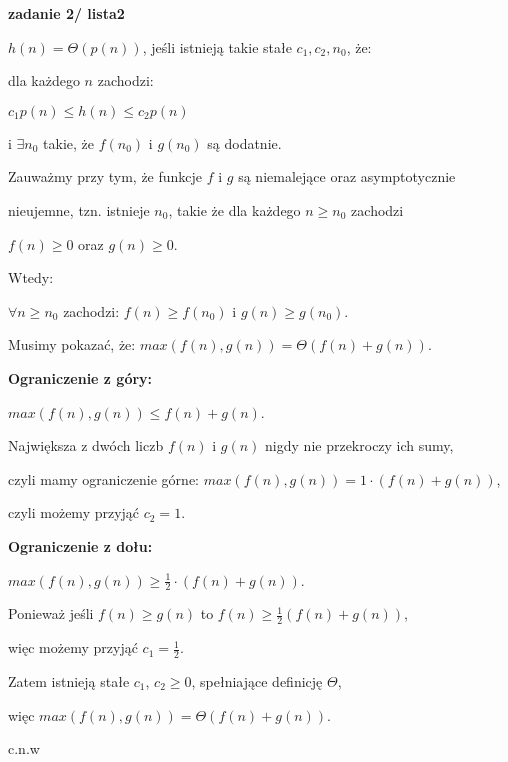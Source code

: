 \documentclass{article}
\begin{document}
    \vspace{1\baselineskip}
    \textbf{zadanie 2/ lista2} \par
    $h(n) = \Theta(p(n))$, jeśli istnieją takie stałe $c_1, c_2, n_0 $, że: \par
    dla każdego $n$ zachodzi: \par
    $c_1p(n) \leq h(n) \leq c_2p(n)$ \par
    i $\exists n_0$ takie, że $f(n_0)$ i $g(n_0)$ są dodatnie. \par
    \par
    Zauważmy przy tym, że funkcje $f$ i $g$ są niemalejące oraz asymptotycznie \par nieujemne, tzn. istnieje $n_0$, takie że dla każdego $n \geq n_0$ zachodzi \par $f(n) \geq 0$ oraz $g(n) \geq 0$. \par
    \par
    \vspace{1\baselineskip}
    Wtedy: \par
    $\forall n \geq n_0$ zachodzi: $f(n) \geq f(n_0)$ i $g(n) \geq g(n_0)$. \par 
    \par
    Musimy pokazać, że: $max(f(n), g(n)) = \Theta(f(n) + g(n))$. \par
    \par
    \vspace{1\baselineskip}
    \textbf{Ograniczenie z góry:} \par
    $max(f(n), g(n)) \leq f(n) + g(n)$. \par
    \par
    Największa z dwóch liczb $f(n)$ i $g(n)$ nigdy nie przekroczy ich sumy, \par
    czyli mamy ograniczenie górne: $max(f(n), g(n)) = 1 \cdot (f(n) + g(n))$, \par
    czyli możemy przyjąć $c_2 = 1$. \par
    \par
    \vspace{1\baselineskip}
    \textbf{Ograniczenie z dołu:} \par
    $max(f(n), g(n)) \geq \frac{1}{2} \cdot (f(n) + g(n))$. \par
    \par
    Ponieważ jeśli $f(n) \geq g(n)$ to $f(n) \geq \frac{1}{2}(f(n) + g(n))$, \par
    więc możemy przyjąć $c_1 = \frac{1}{2}$. \par
    \par
    Zatem istnieją stałe $c_1$, $c_2 \geq 0$, spełniające definicję $\Theta$, \par
    więc $max(f(n), g(n)) = \Theta(f(n) + g(n))$. \par
    \par
    c.n.w \par
    \vspace{1\baselineskip}
\end{document}
